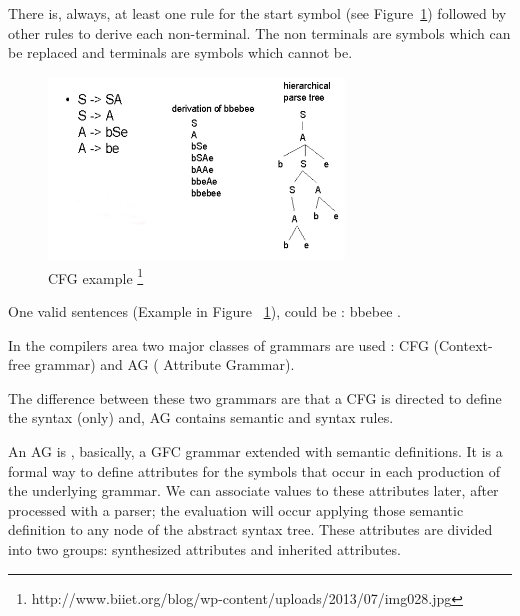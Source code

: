 \documentclass[
  oneside,
  11pt, a4paper,
  footinclude=true,
  headinclude=true,
  cleardoublepage=empty
]{scrbook}
\begin{document}




There is, always, at least one rule for the start symbol (see Figure~\ref{fig:CFG}) followed by other rules to derive each non-terminal.
The non terminals are symbols which can be replaced and terminals are symbols which cannot be.

\begin{figure}[h!]
  \centering
    \includegraphics[width=0.7\textwidth]{img/GIC2.png}
    \caption{CFG example \protect\footnote{http://www.biiet.org/blog/wp-content/uploads/2013/07/img028.jpg}}
    \label{fig:CFG}
\end{figure}


One valid sentences (Example in Figure ~\ref{fig:CFG}), could be : bbebee .

In the compilers area two major classes of grammars are used : CFG (Context-free grammar) and AG ( Attribute Grammar).

The difference between these two grammars are that a CFG is directed to define the syntax (only) and, AG contains semantic and syntax rules.

An AG is , basically, a GFC grammar extended with semantic definitions. It is a formal way to define attributes for the symbols that occur in each production of the underlying grammar. We can associate values to these attributes later, after processed with a parser; the evaluation will occur applying those semantic definition to any node of the abstract syntax tree.
These attributes are divided into two groups: synthesized attributes and inherited attributes.
\end{document}
